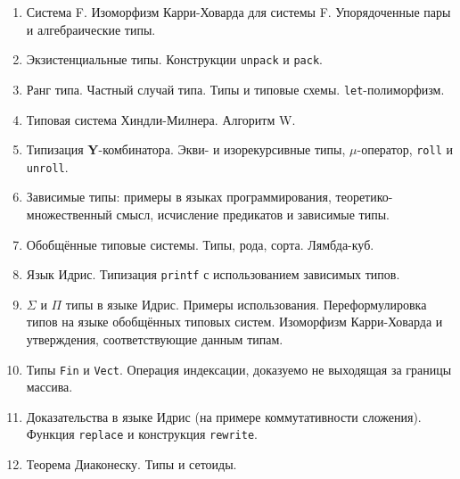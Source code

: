 \documentclass[12pt,a4paper,oneside]{book}
\begin{document}
\begin{enumerate}
\item Система F. Изоморфизм Карри-Ховарда для системы F. Упорядоченные пары и алгебраические типы.
\item Экзистенциальные типы. Конструкции \texttt{unpack} и \texttt{pack}.
\item Ранг типа. Частный случай типа. Типы и типовые схемы. \texttt{let}-полиморфизм.
\item Типовая система Хиндли-Милнера. Алгоритм W.
\item Типизация \textbf{Y}-комбинатора. Экви- и изорекурсивные типы, $\mu$-оператор, \texttt{roll} и \texttt{unroll}.
\item Зависимые типы: примеры в языках программирования, теоретико-множественный смысл, исчисление предикатов
и зависимые типы.
\item Обобщённые типовые системы. Типы, рода, сорта. Лямбда-куб.
\item Язык Идрис. Типизация \texttt{printf} с использованием зависимых типов.
\item $\Sigma$ и $\Pi$ типы в языке Идрис. Примеры использования.
Переформулировка типов на языке обобщённых типовых систем.
Изоморфизм Карри-Ховарда и утверждения, соответствующие данным типам.
\item Типы \texttt{Fin} и \texttt{Vect}. Операция индексации, доказуемо не выходящая за границы массива.
\item Доказательства в языке Идрис (на примере коммутативности сложения). Функция \texttt{replace} и 
конструкция \texttt{rewrite}.
\item Теорема Диаконеску. Типы и сетоиды.
\end{enumerate}
\end{document}
